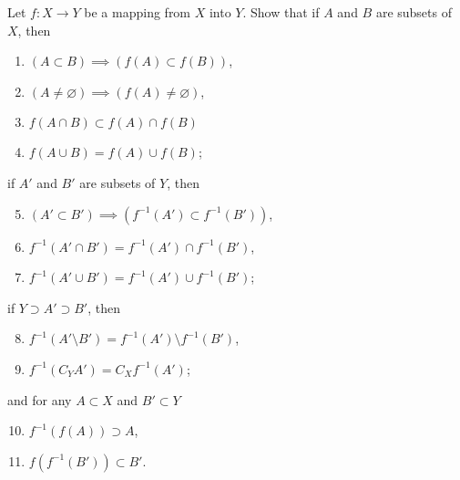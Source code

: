 \begin{exercise}
    Let $f: X\to Y$ be a mapping from $X$ into $Y$. Show that if $A$ and $B$ are subsets of $X$, then
    \begin{enumerate}[label={(\alph*)}]
        \item $(A\subset B)\implies (f(A)\subset f(B))$,
        \item $(A\ne\varnothing) \implies (f(A) \ne \varnothing)$,
        \item $f(A\cap B) \subset f(A)\cap f(B)$
        \item $f(A\cup B) = f(A)\cup f(B)$;
    \end{enumerate}

    if $A'$ and $B'$ are subsets of $Y$, then
    \begin{enumerate}[label={(\alph*)}]
        \setcounter{enumi}{4}
        \item $(A'\subset B')\implies (f^{-1}(A')\subset f^{-1}(B'))$,
        \item $f^{-1}(A'\cap B') = f^{-1}(A')\cap f^{-1}(B')$,
        \item $f^{-1}(A'\cup B') = f^{-1}(A')\cup f^{-1}(B')$;
    \end{enumerate}

    if $Y\supset A'\supset B'$, then
    \begin{enumerate}[label={(\alph*)}]
        \setcounter{enumi}{7}
        \item $f^{-1}(A'\setminus B') = f^{-1}(A')\setminus f^{-1}(B')$,
        \item $f^{-1}(C_{Y}A') = C_{X}f^{-1}(A')$;
    \end{enumerate}

    and for any $A\subset X$ and $B'\subset Y$
    \begin{enumerate}[label={(\alph*)}]
        \setcounter{enumi}{9}
        \item $f^{-1}(f(A))\supset A$,
        \item $f(f^{-1}(B'))\subset B'$.
    \end{enumerate}
\end{exercise}

